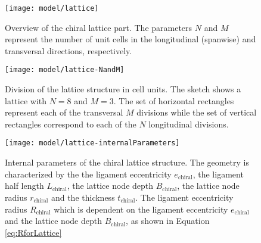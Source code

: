 \begin{figure}[!htpb]
  \centering
  \texttt{[image: model/lattice]}
  \caption[Overview of the chiral lattice part]{Overview of the chiral lattice part. The parameters $N$ and $M$ represent the number of unit cells in the longitudinal (spanwise) and transversal directions, respectively.}\label{fig:lattice}
\end{figure}

\begin{figure}[!htpb]
  \centering
  \texttt{[image: model/lattice-NandM]}
  \caption[Division of the lattice structure in cell units]{Division of the lattice structure in cell units. The sketch shows a lattice with $N = 8$ and $M = 3$. The set of horizontal rectangles represent each of the transversal $M$ divisions while the set of vertical rectangles correspond to each of the $N$ longitudinal divisions.}\label{fig:lattice-NandM}
\end{figure}

\begin{figure}[!htpb]
  \centering
  \texttt{[image: model/lattice-internalParameters]}
  \caption[Internal parameters of the chiral lattice structure]{Internal parameters of the chiral lattice structure. The geometry is characterized by the the ligament eccentricity $e_{\mathrm{chiral}}$, the ligament half length $L_{\mathrm{chiral}}$, the lattice node depth $B_{\mathrm{chiral}}$, the lattice node radius $r_{\mathrm{chiral}}$ and the thickness $t_{\mathrm{chiral}}$. The ligament eccentricity radius $R_{\mathrm{chiral}}$ which is dependent on the ligament eccentricity $e_{\mathrm{chiral}}$ and the lattice node depth $B_{\mathrm{chiral}}$, as shown in Equation \ref{eq:RforLattice}}\label{fig:lattice-internalParameters}
\end{figure}

